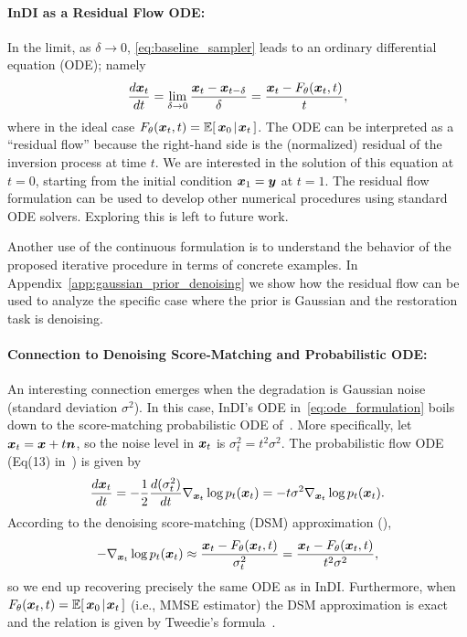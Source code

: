 \documentclass[10pt]{article} %
\begin{document}
\paragraph{InDI as a Residual Flow ODE:} In the limit, as $\delta \to 0$, \eqref{eq:baseline_sampler} leads to an ordinary differential equation (ODE); namely
\begin{align}
\frac{ d{\bm{x}}_t}{d t} = \lim_{\delta \to 0} \frac{{\bm{x}}_t - {\bm{x}}_{t-\delta}}{\delta} = \frac{{\bm{x}}_t - F_\theta({\bm{x}}_t, t)}{t},
\label{eq:ode_formulation}
\end{align}
where in the ideal case $F_\theta({\bm{x}}_t,t) = \mathbb{E}[\,{\bm{x}}_0\!\mid\!{\bm{x}}_t\,]$.
The ODE can be interpreted as a ``residual flow'' because the right-hand side is the (normalized) residual of the inversion process at time $t$. We are interested in the solution of this equation at $t=0$, starting from the initial condition ${\bm{x}}_1={\bm{y}}$ at $t=1$. The residual flow formulation can be used to develop other numerical procedures using standard ODE solvers. Exploring this is left to future work.

Another use of the continuous formulation is to understand the behavior of the proposed iterative procedure in terms of concrete examples. In Appendix~\ref{app:gaussian_prior_denoising} we show how the residual flow can be used to analyze the specific case where the prior is Gaussian and the restoration task is denoising.


\paragraph{Connection to Denoising Score-Matching and Probabilistic ODE:}
An interesting connection emerges when the degradation is Gaussian noise (standard deviation $\sigma^2$). In this case, InDI's ODE in~\eqref{eq:ode_formulation} boils down to the score-matching probabilistic ODE of~\citet{ncsnv3}. More specifically, let ${\bm{x}}_t = {\bm{x}} + t {\bm{n}}$, so the noise level in ${\bm{x}}_t$ is $\sigma^2_t = t^2 \sigma^2$. The probabilistic flow ODE (Eq(13) in~\cite{ncsnv3}) is given by
$$
\frac{d{\bm{x}}_t}{dt} = -\frac{1}{2}\frac{d(\sigma_t^2)}{dt} \nabla_{{\bm{x}}_t} \log p_t({\bm{x}}_t) = -t \sigma^2  \nabla_{{\bm{x}}_t} \log p_t({\bm{x}}_t).
$$
According to the denoising score-matching (DSM) approximation (\cite{vincent2011connection}),
$$
-\nabla_{{\bm{x}}_t} \log p_t({\bm{x}}_t) \approx \frac{{\bm{x}}_t - F_\theta({\bm{x}}_t,t)}{\sigma^2_t} = \frac{{\bm{x}}_t - F_\theta({\bm{x}}_t,t)}{t^2\sigma^2}, 
$$
so we end up recovering precisely the same ODE as in InDI. Furthermore, when $F_\theta({\bm{x}}_t,t)= \mathbb{E}[\,{\bm{x}}_0\!\mid\!{\bm{x}}_t\,]$ (i.e., MMSE estimator) the DSM approximation is exact and the relation is given by Tweedie's formula~\citep{robbins1956empirical,efron2011tweedie}. 
\end{document}
